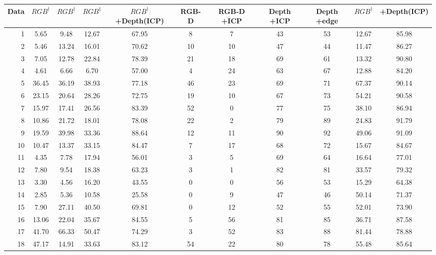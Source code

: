 {\begin{table*}[t]
\begin{adjustbox}{max width=\textwidth}
\begin{tabular}{r|ccc|ccccc|cc}
			Data & $RGB^\dag$ & $RGB^\dag$ &$RGB^\ddag$ & $RGB^\dag$+Depth(ICP)  & RGB-D &RGB-D +ICP  & Depth +ICP & Depth +edge & $RGB^\dag$ & +Depth(ICP)\\     
			\midrule                                                  
			1 &       5.65 &   		9.48 &   12.67 &   67.95  & 8&  7 &  43 &   53 & 12.67 &     85.98 \\
			2 &       5.46 &   		13.24 &  16.01 &   70.62  & 10&     10 &  47 &   44 & 11.47 &     86.27 \\
			3 &       7.05 &   		12.78 &  22.84 &   78.39  & 21&     18 &  69 &   61 & 13.32 &     90.80 \\
			4 &       4.61 &   		6.66 &   6.70 &    57.00  & 4&  24 &  63 &   67 & 12.88 &     84.20 \\
			5 &      36.45 &   		36.19 &  38.93 &   77.18  & 46&     23 &  69 &   71 & 67.37 &     90.14 \\
			6 &      23.15 &   		20.64 &  28.26 &   72.75  & 19&     10 &  67 &   73 & 54.21 &     90.58 \\
			7 &      15.97 &   		17.41 &  26.56 &   83.39  & 52&     0 &  77 &   75 & 38.10 &     86.94 \\
			8 &       10.86 &  		21.72 &  18.01 &   78.08  & 22&     2 &  79 &  89 & 24.83 &     91.79 \\
			9 &      19.59 &   		39.98 &  33.36 &   88.64  & 12&     11 &  90 &   92 & 49.06 &     91.09 \\
			10 &       10.47 & 		13.37 &  33.15 &   84.47  & 7&      17 &  68 &  72 & 15.67 &     84.67 \\
			11 &       4.35 &  		7.78 &   17.94 &   56.01  & 3&  5 &  69 &   64 & 16.64 &     77.01 \\
			12 &       7.80 &  		9.54 &   18.38 &   63.23  & 3&  1 &  82 &   81 & 33.57 &     79.32 \\
			13 &       3.30 &  		4.56 &   16.20 &   43.55  & 0&  0 &  56 &   53 & 15.29 &     64.38 \\
			14 &       2.85 &  		5.36 &   10.58 &   25.58  & 0&  9 &  47 &   46 & 50.14 &     71.37 \\
			15 &       7.90 &  		27.11 &  40.50 &   69.81  & 0&  12 &  52 &   55 & 52.01 &     73.90 \\
			16 &      13.06 &  		22.04 &  35.67 &   84.55  & 5&  56 &  81 &   85 & 36.71 &     87.58 \\
			17 &      41.70 &  		66.33 &  50.47 &   74.29  & 3&  52 &  83 &   88 & 81.44 &     78.88 \\
			18 &      47.17 &  		14.91 &  33.63 &   83.12  & 54&     22 &  80 &   78 & 55.48 &     85.64 \\

\end{tabular}
\end{adjustbox}
\end{table*}}
